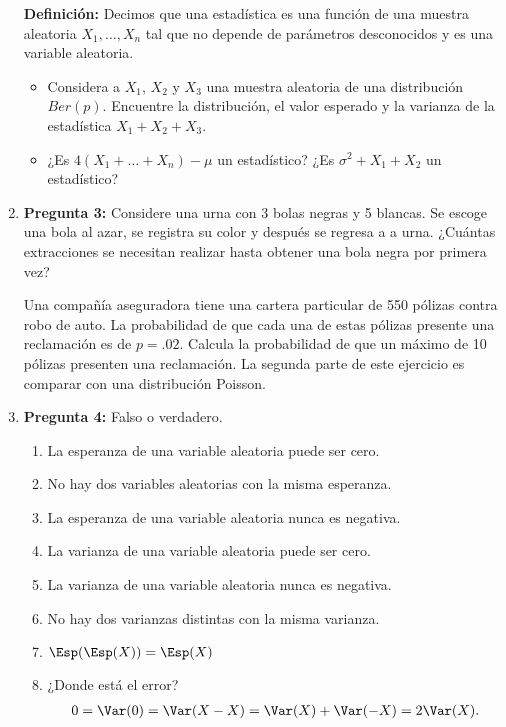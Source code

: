\documentclass{assignment}
\begin{document}
\begin{enumerate}
\textbf{Definición:}
Decimos que una estadística es una función de una muestra aleatoria $X_1, \dots, X_n$ tal que no depende de parámetros desconocidos y es una variable aleatoria.
\begin{itemize}
    \item Considera a $X_1$, $X_2$ y $X_3$ una muestra aleatoria de una distribución $Ber(p)$. Encuentre la distribución, el valor esperado y la varianza de la estadística $X_1+X_2+X_3.$
    \item ¿Es $4(X_1 + \dots + X_n) - \mu$ un estadístico? ¿Es $\sigma^2+  X_1 + X_2$  un estadístico? 
\end{itemize}

\item \textbf{Pregunta 3:}
Considere una urna con 3 bolas negras y 5 blancas. Se escoge una bola al azar, se registra su color y después se regresa a a urna. ¿Cuántas extracciones se necesitan realizar hasta obtener una bola negra por primera vez?

Una compañía aseguradora tiene una cartera particular de 550 pólizas contra robo de auto. La probabilidad de que cada una de estas pólizas presente una reclamación es de $p=.02$. Calcula la probabilidad de que un máximo de 10 pólizas presenten una reclamación. La segunda parte de este ejercicio es comparar con una distribución Poisson.  

\item \textbf{Pregunta 4:}
Falso o verdadero.
\begin{enumerate}
    \item La esperanza de una variable aleatoria puede ser cero. 
    \item No hay dos variables aleatorias con la misma esperanza. 
    \item La esperanza de una variable aleatoria nunca es negativa. 
    \item La varianza de una variable aleatoria puede ser cero. 
    \item La varianza de una variable aleatoria nunca es negativa.
    \item No hay dos varianzas distintas con la misma varianza. 
    \item $\Esp(\Esp(X))=\Esp(X)$
    \item ¿Donde está el error?
\begin{align*}
    0 = \Var(0)= \Var(X-X)=\Var(X)+\Var(-X)=2 \Var(X).
\end{align*}
\end{enumerate}


\end{enumerate}
\end{document}
